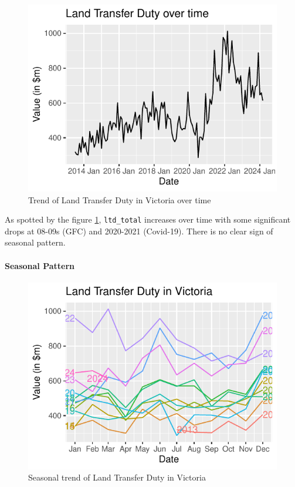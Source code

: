 \documentclass[11pt,a4paper,]{article}
\begin{document}
\begin{figure}[H]

{\centering \includegraphics{Final_Report_files/figure-latex/trend-1} 

}

\caption{Trend of Land Transfer Duty in Victoria over time}\label{fig:trend}
\end{figure}

As spotted by the figure \ref{fig:trend}, \texttt{ltd\_total} increases over time with some significant drops at 08-09s (GFC) and 2020-2021 (Covid-19). There is no clear sign of seasonal pattern.

\paragraph{Seasonal Pattern}\label{seasonal-pattern}

\begin{figure}[H]

{\centering \includegraphics{Final_Report_files/figure-latex/sspattern-1} 

}

\caption{Seasonal trend of Land Transfer Duty in Victoria}\label{fig:sspattern}
\end{figure}
\end{document}
